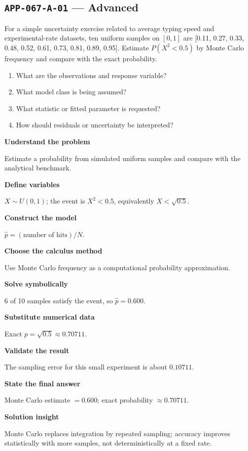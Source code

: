 \documentclass[11pt]{book}
\newcommand{\pid}[1]{\texttt{#1}}
\begin{document}
\subsection*{\pid{APP-067-A-01} — Advanced}
\begin{problembox}
For a simple uncertainty exercise related to average typing speed and experimental-rate datasets, ten uniform samples on $[0,1]$ are [0.11, 0.27, 0.33, 0.48, 0.52, 0.61, 0.73, 0.81, 0.89, 0.95]. Estimate $P(X^2<0.5)$ by Monte Carlo frequency and compare with the exact probability.
\end{problembox}
\begin{promptbox}\begin{enumerate}
\item What are the observations and response variable?
\item What model class is being assumed?
\item What statistic or fitted parameter is requested?
\item How should residuals or uncertainty be interpreted?
\end{enumerate}\end{promptbox}
\begin{solutionbox}
\textbf{Understand the problem}\par Estimate a probability from simulated uniform samples and compare with the analytical benchmark.\par\medskip
\textbf{Define variables}\par $X\sim U(0,1)$; the event is $X^2<0.5$, equivalently $X<\sqrt{0.5}$.\par\medskip
\textbf{Construct the model}\par $\widehat p=(\text{number of hits})/N$.\par\medskip
\textbf{Choose the calculus method}\par Use Monte Carlo frequency as a computational probability approximation.\par\medskip
\textbf{Solve symbolically}\par 6 of 10 samples satisfy the event, so $\widehat p=0.600$.\par\medskip
\textbf{Substitute numerical data}\par Exact $p=\sqrt{0.5}\approx 0.70711$.\par\medskip
\textbf{Validate the result}\par The sampling error for this small experiment is about $0.10711$.\par\medskip
\textbf{State the final answer}\par Monte Carlo estimate $=0.600$; exact probability $\approx 0.70711$.\par\medskip
\textbf{Solution insight}\par Monte Carlo replaces integration by repeated sampling; accuracy improves statistically with more samples, not deterministically at a fixed rate.\par\medskip
\end{solutionbox}
\end{document}
